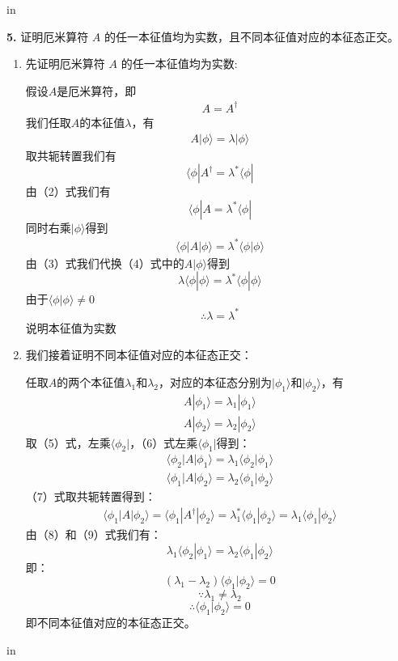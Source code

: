 \documentclass[11pt]{article}
\begin{document}
 in

{\bf 5.} 证明厄米算符 $A$ 的任一本征值均为实数，且不同本征值对应的本征态正交。

\begin{enumerate}[label=\alph*.]
\item 先证明厄米算符 $A$ 的任一本征值均为实数:

假设$A$是厄米算符，即
\begin{align}
    A = A^{\dagger}    
\end{align}
我们任取$A$的本征值$\lambda$，有
\begin{align}
    A|\phi\rangle = \lambda|\phi \rangle    
\end{align}
取共轭转置我们有
\[\langle \phi | A^{\dagger}  = \lambda^{*}\langle \phi | \]
由（2）式我们有
\[\langle \phi | A  = \lambda^{*}\langle \phi | \]
同时右乘$|\phi \rangle$得到
\begin{align}
    \langle \phi | A|\phi \rangle=\lambda^{*}\langle \phi |\phi \rangle    
\end{align}
由（3）式我们代换（4）式中的$A|\phi \rangle$得到
\[ \lambda \langle \phi |\phi \rangle=\lambda^{*}\langle \phi |\phi \rangle \]   
由于$\langle \phi |\phi \rangle \neq 0$
\[\therefore \lambda = \lambda^{*}\]
说明本征值为实数

\item 我们接着证明不同本征值对应的本征态正交：

任取$A$的两个本征值$\lambda_1$和$\lambda_2$，对应的本征态分别为$|\phi_1\rangle$和$|\phi_2\rangle$，有
\begin{align}
    A|\phi_1\rangle = \lambda_1|\phi_1 \rangle
\end{align}
\begin{align}
    A|\phi_2\rangle = \lambda_2|\phi_2 \rangle
\end{align}
取（5）式，左乘$\langle \phi_2|$，（6）式左乘$\langle \phi_1|$得到：
\begin{align}
    \langle \phi_2 | A|\phi_1 \rangle = \lambda_1\langle \phi_2 |\phi_1 \rangle
\end{align}
\begin{align}
    \langle \phi_1 | A|\phi_2 \rangle = \lambda_2\langle \phi_1 |\phi_2 \rangle
\end{align}
（7）式取共轭转置得到：
\begin{align}
    \langle \phi_1 | A|\phi_2 \rangle = \langle \phi_1 | A^{\dagger}|\phi_2 \rangle = \lambda_1^{*}\langle \phi_1 |\phi_2\rangle = \lambda_1\langle \phi_1 |\phi_2\rangle
\end{align}
由（8）和（9）式我们有：
\[\lambda_1\langle \phi_2 |\phi_1 \rangle = \lambda_2\langle \phi_1 |\phi_2 \rangle\]
即：
\[ \left(\lambda_1-\lambda_2\right)\langle \phi_1 |\phi_2 \rangle = 0\]
\[\because \lambda_1 \neq \lambda_2\]
\[\therefore \langle \phi_1 |\phi_2 \rangle  = 0\]
即不同本征值对应的本征态正交。
\end{enumerate}
 in
\end{document}
